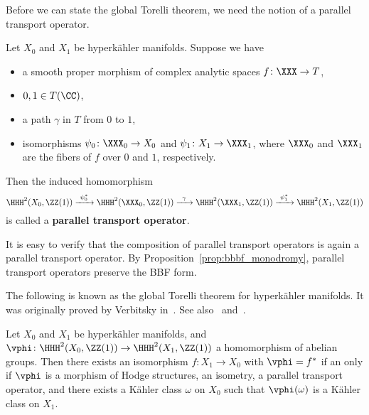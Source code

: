 %

Before we can state the global Torelli theorem, we need the notion of a parallel transport operator.
\begin{definition}\label{def:pto}
Let $X_0$ and $X_1$ be hyperk\"ahler manifolds. Suppose we have
\begin{itemize}
\item a smooth proper morphism of complex analytic spaces $f\colon \XXX \rightarrow T$,
\item $0,1 \in T(\CC)$, 
\item a path $\gamma$ in $T$ from $0$ to $1$,
\item isomorphisms $\psi_0\colon \XXX_0 \rightarrow X_0$ and $\psi_1\colon X_1 \rightarrow \XXX_1$, where $\XXX_0$ and $\XXX_1$ are the fibers of $f$ over $0$ and $1$, respectively.
\end{itemize}
Then the induced homomorphism
$$
\HHH^2(X_0,\ZZ(1)) \xrightarrow{\ \psi_0^* \ } \HHH^2(\XXX_0,\ZZ(1)) \xrightarrow{\ \, \gamma \, \ } \HHH^2(\XXX_1,\ZZ(1)) \xrightarrow{\ \psi_1^* \ } \HHH^2(X_1,\ZZ(1))
$$
is called a {\bfseries parallel transport operator}.
\end{definition}

\begin{remark}
It is easy to verify that the composition of parallel transport operators is again a parallel transport operator. By Proposition~\ref{prop:bbbf_monodromy}, parallel transport operators preserve the BBF form.
\end{remark}

The following is known as the global Torelli theorem for hyperk\"ahler manifolds. It was originally proved by Verbitsky in~\cite{VerbitskyTorelli}. See also~\cite{MarkmanSurvey} and~\cite{HuybrechtsBourb}.
\begin{theorem}\label{thm:unpolarized_global_torelli}
Let $X_0$ and $X_1$ be hyperk\"ahler manifolds, and $\vphi\colon \HHH^2(X_0,\ZZ(1)) \rightarrow \HHH^2(X_1,\ZZ(1))$ a homomorphism of abelian groups. Then there exists an isomorphism $f\colon X_1 \rightarrow X_0$ with $\vphi = f^*$ if an only if $\vphi$ is a morphism of Hodge structures, an isometry, a parallel transport operator, and there exists a K\"ahler class $\omega$ on $X_0$ such that $\vphi(\omega)$ is a K\"ahler class on $X_1$.
\end{theorem}

